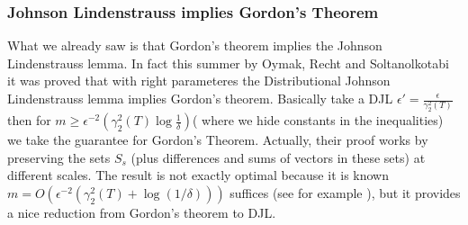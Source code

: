 \documentclass[11pt]{article}
\begin{document}
 
\subsubsection{Johnson Lindenstrauss implies Gordon's Theorem }

What we already saw is that Gordon's theorem implies the Johnson Lindenstrauss lemma. In fact this summer by Oymak, Recht and Soltanolkotabi \cite{Recht} it was proved that with right parameteres the Distributional Johnson Lindenstrauss lemma implies Gordon's theorem. Basically take a DJL $\epsilon' = \frac{\epsilon}{\gamma_2^2(T)}$ then for $m \geq \epsilon^{-2} ( \gamma_2^2(T)\log\frac{1}{\delta})$( where we hide constants in the inequalities) we take the guarantee for Gordon's Theorem. Actually, their proof works by preserving the sets $S_s$ (plus differences and sums of vectors in these sets) at different scales. The result is not exactly optimal because it is known $m = O(\epsilon^{-2}(\gamma_2^2(T) + \log(1/\delta)))$ suffices (see for example \cite{Jagermann,Dirksen}), but it provides a nice reduction from Gordon's theorem to DJL.
 




\end{document}
